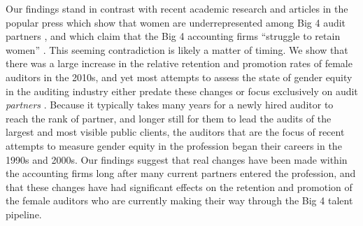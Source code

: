 \documentclass[11pt]{article}
\begin{document}
    Our findings stand in contrast with recent academic research and articles in the popular press which show that women are underrepresented among Big 4 audit partners \parencite{burkeAuditPartnerIdentification2019, leeAuditPartnerAssignments2019, rapoportWomenRarelyRun2018}, and which claim that the Big 4 accounting firms ``struggle to retain women'' \parencite{kornbergerChangingGenderDomination2010}. This seeming contradiction is likely a matter of timing. We show that there was a large increase in the relative retention and promotion rates of female auditors in the 2010s, and yet most attempts to assess the state of gender equity in the auditing industry either predate these changes \parencite{kornbergerChangingGenderDomination2010, daltonWomenManagersPartners1997,anderson-goughHelpingThemForget2005} or focus exclusively on audit \textit{partners} \parencite{burkeAuditPartnerIdentification2019, leeAuditPartnerAssignments2019, rapoportWomenRarelyRun2018}. Because it typically takes many years for a newly hired auditor to reach the rank of partner, and longer still for them to lead the audits of the largest and most visible public clients, the auditors that are the focus of recent attempts to measure gender equity in the profession began their careers in the 1990s and 2000s. Our findings suggest that real changes have been made within the accounting firms long after many current partners entered the profession, and that these changes have had significant effects on the retention and promotion of the female auditors who are currently making their way through the Big 4 talent pipeline. 
    
\end{document}
